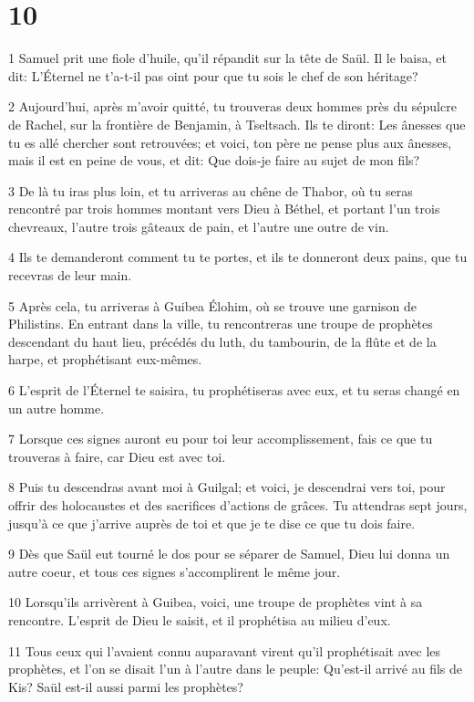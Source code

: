 \chapter{10}

\par 1 Samuel prit une fiole d'huile, qu'il répandit sur la tête de Saül. Il le baisa, et dit: L'Éternel ne t'a-t-il pas oint pour que tu sois le chef de son héritage?
\par 2 Aujourd'hui, après m'avoir quitté, tu trouveras deux hommes près du sépulcre de Rachel, sur la frontière de Benjamin, à Tseltsach. Ils te diront: Les ânesses que tu es allé chercher sont retrouvées; et voici, ton père ne pense plus aux ânesses, mais il est en peine de vous, et dit: Que dois-je faire au sujet de mon fils?
\par 3 De là tu iras plus loin, et tu arriveras au chêne de Thabor, où tu seras rencontré par trois hommes montant vers Dieu à Béthel, et portant l'un trois chevreaux, l'autre trois gâteaux de pain, et l'autre une outre de vin.
\par 4 Ils te demanderont comment tu te portes, et ils te donneront deux pains, que tu recevras de leur main.
\par 5 Après cela, tu arriveras à Guibea Élohim, où se trouve une garnison de Philistins. En entrant dans la ville, tu rencontreras une troupe de prophètes descendant du haut lieu, précédés du luth, du tambourin, de la flûte et de la harpe, et prophétisant eux-mêmes.
\par 6 L'esprit de l'Éternel te saisira, tu prophétiseras avec eux, et tu seras changé en un autre homme.
\par 7 Lorsque ces signes auront eu pour toi leur accomplissement, fais ce que tu trouveras à faire, car Dieu est avec toi.
\par 8 Puis tu descendras avant moi à Guilgal; et voici, je descendrai vers toi, pour offrir des holocaustes et des sacrifices d'actions de grâces. Tu attendras sept jours, jusqu'à ce que j'arrive auprès de toi et que je te dise ce que tu dois faire.
\par 9 Dès que Saül eut tourné le dos pour se séparer de Samuel, Dieu lui donna un autre coeur, et tous ces signes s'accomplirent le même jour.
\par 10 Lorsqu'ils arrivèrent à Guibea, voici, une troupe de prophètes vint à sa rencontre. L'esprit de Dieu le saisit, et il prophétisa au milieu d'eux.
\par 11 Tous ceux qui l'avaient connu auparavant virent qu'il prophétisait avec les prophètes, et l'on se disait l'un à l'autre dans le peuple: Qu'est-il arrivé au fils de Kis? Saül est-il aussi parmi les prophètes?
